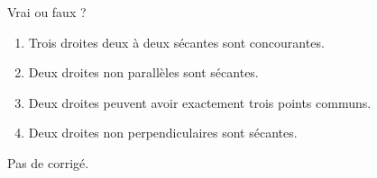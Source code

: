 \begin{exercice*}
    Vrai ou faux ?
    \begin{enumerate}
       \item Trois droites deux à deux  sécantes sont concourantes.
       \item Deux droites non parallèles sont sécantes.
       \item Deux droites peuvent avoir exactement trois points communs.
       \item Deux droites non perpendiculaires sont sécantes.
    \end{enumerate}
 \end{exercice*}
\begin{corrige}
Pas de corrigé.
\end{corrige}